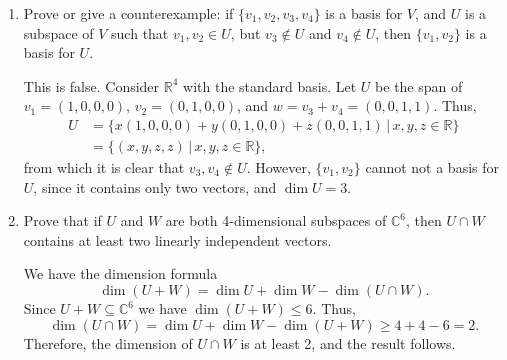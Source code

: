 \documentclass[letterpaper,12pt]{article}
\newcommand{\R}{\mathbb{R}}
\newcommand{\C}{\mathbb{C}}
\begin{document}
\begin{enumerate}
\bigskip

 \item Prove or give a counterexample: if $\{v_1,v_2,v_3,v_4\}$ is a basis for $V$,  and $U$ is a subspace of $V$ such that $v_1, v_2\in U$, but $v_3\notin U$ and $v_4\notin U$, then $\{v_1,v_2\}$ is a basis for $U$.
 
 \bigskip
 
 This is false. Consider $\R^4$  with the standard basis. Let $U$ be the span of $v_1 = (1,0,0,0)$, $v_2 = (0,1,0,0)$, and $w = v_3+v_4 = (0,0,1,1)$. Thus,
\begin{align*}
 U &= \{x(1,0,0,0)+y(0,1,0,0)+z(0,0,1,1)\,|\, x,y,z\in\R\}\\
& = \{(x,y,z,z) \,|\, x,y,z\in\R\},
\end{align*}
from which it is clear that $v_3,v_4\notin U$. However, $\{v_1,v_2\}$ cannot not a basis for $U$, since it contains only two vectors, and $\dim U = 3$.
 
 \bigskip
 
 \item Prove that if $U$ and $W$ are both 4-dimensional subspaces of $\C^6$, then $U\cap W$ contains at least two linearly independent vectors.
 
 \bigskip
 
 We have the dimension formula
 \[
 \dim(U+W) = \dim U + \dim W-\dim (U\cap W).
 \]
 Since $U+W\subseteq \C^6$ we have $\dim (U+W)\leq 6$. Thus,
 \[
 \dim(U\cap W) = \dim U + \dim W-\dim(U+W) \geq 4+4-6 = 2.
 \]
 Therefore, the dimension of $U\cap W$ is at least 2, and the result follows.
 \end{enumerate}
\end{document}
